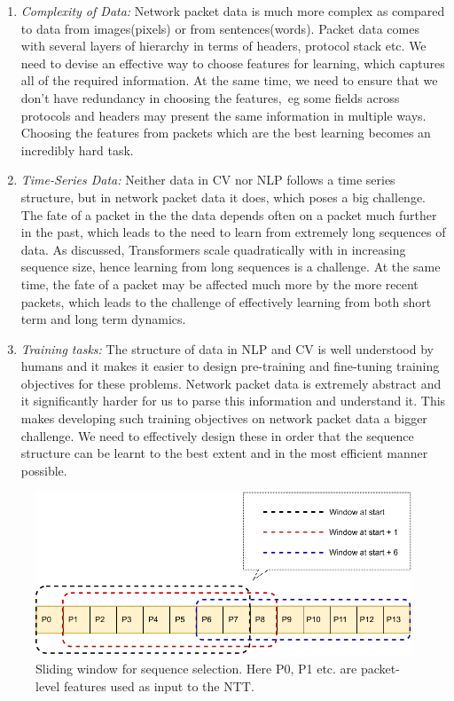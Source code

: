 \begin{enumerate}
\item \emph{Complexity of Data:} Network packet data is much more complex as compared to data from images(pixels) or from sentences(words). Packet data comes with several layers of hierarchy in terms of headers, protocol stack etc. We need to devise an effective way to choose features for learning, which captures all of the required information. At the same time, we need to ensure that we don't have redundancy in choosing the features,\ eg some fields across protocols and headers may present the same information in multiple ways. Choosing the features from packets which are the best learning becomes an incredibly hard task.

\item \emph{Time-Series Data:} Neither data in CV nor NLP follows a time series structure, but in network packet data it does, which poses a big challenge. The fate of a packet in the the data depends often on a packet much further in the past, which leads to the need to learn from extremely long sequences of data. As discussed, Transformers scale quadratically with in increasing sequence size, hence learning from long sequences is a challenge. At the same time, the fate of a packet may be affected much more by the more recent packets, which leads to the challenge of effectively learning from both short term and long term dynamics.

\item \emph{Training tasks:} The structure of data in NLP and CV is well understood by humans and it makes it easier to design pre-training and fine-tuning training objectives for these problems. Network packet data is extremely abstract and it significantly harder for us to parse this information and understand it. This makes developing such training objectives on network packet data a bigger challenge. We need to effectively design these in order that the sequence structure can be learnt to the best extent and in the most efficient manner possible.

\end{enumerate}

\begin{figure}[h]
  \begin{center}
    \includegraphics[scale=1]{figures/slidingwindow.pdf}
    \caption{Sliding window for sequence selection. Here P0, P1 etc. are packet-level features used as input to the NTT.}
    \label{fig:sliding}
  \end{center}
\end{figure}


